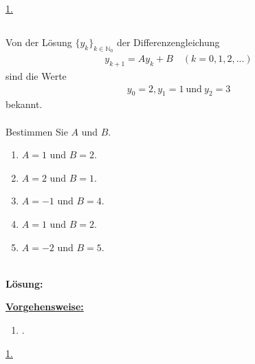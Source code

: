 \underline{1. }\\
\newpage

\subsection*{}
Von der Lösung $ \{y_k\}_{k \in \mathbb{N}_0} $ der Differenzengleichung
\begin{align*}
	y_{k+1} = A y_k + B \quad (k = 0,1,2,...)
\end{align*}
sind die Werte
\begin{align*}
	y_0 = 2, y_1 = 1 \ \textrm{und} \ y_2 = 3
\end{align*}
bekannt.\\
\\
Bestimmen Sie $ A $ und $ B $.
\renewcommand{\labelenumi}{(\alph{enumi})}
\begin{enumerate}
	\item
	$ A=1 $ und $ B=2 $.
	\item
	$ A=2 $ und $ B=1 $.	
	\item 
	$ A=-1 $ und $ B=4 $.
	\item
	$ A=1 $ und $ B=2 $.
	\item
	$ A=-2 $ und $ B=5 $.
\end{enumerate}
\ \\
\textbf{Lösung:}
\begin{mdframed}
\underline{\textbf{Vorgehensweise:}}
\renewcommand{\labelenumi}{\theenumi.}
\begin{enumerate}
\item .
\end{enumerate}
\end{mdframed}

\underline{1. }\\

\newpage


